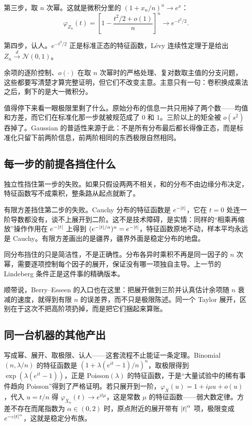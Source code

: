 第三步，取 \(n\) 次幂。这就是微积分里的 \((1+x_n/n)^n\to e^x\)：
\[
\varphi_{Z_n}(t)=\left[1-\frac{t^2/2+o(1)}{n}\right]^n\longrightarrow e^{-t^2/2}.
\]

第四步，认人。\(e^{-t^2/2}\) 正是标准正态的特征函数，Lévy 连续性定理于是给出 \(Z_n\xrightarrow{d}\mathcal N(0,1)\)。

余项的逐阶控制、\(o(\cdot)\) 在取 \(n\) 次幂时的严格处理、复对数取主值的分支问题，这些都要写清楚才算完整证明，但它们不改变主意。主意只有一句：卷积换成乘法之后，剩下的是大一微积分。

值得停下来看一眼极限里剩了什么。原始分布的信息一共只用掉了两个数——均值和方差，而它们在标准化那一步就被规范成了 \(0\) 和 \(1\)。三阶以上的矩全被 \(o(s^2)\) 吞掉了。Gaussian 的普适性来源于此：不是所有分布最后都长得像正态，而是标准化只留下前两阶信息，前两阶相同的东西极限自然相同。

\subsection{每一步的前提各挡住什么}

独立性挡住第一步的失败。如果只假设两两不相关，和的分布不由边缘分布决定，特征函数写不成乘积，整条路从起点就断了。

有限方差挡住第二步的失败。Cauchy 分布的特征函数是 \(e^{-\left|t\right|}\)，它在 \(t=0\) 处连一阶导数都没有，谈不上展开到二阶。这不是技术障碍，是实情：同样的``相乘再缩放''操作作用在 \(e^{-\left|t\right|}\) 上得到 \((e^{-\left|t\right|/n})^n=e^{-\left|t\right|}\)，特征函数原地不动，样本平均永远是 Cauchy。有限方差画出的是疆界，疆界外面是稳定分布的地盘。

同分布挡住的只是简洁性，不是正确性。分布各异时乘积不再是同一因子的 \(n\) 次幂，需要逐项控制每个因子的展开，保证没有哪一项独自主导。上一节的 Lindeberg 条件正是这件事的精确版本。

顺带说，Berry--Esseen 的入口也在这里：把展开做到三阶并认真估计余项随 \(n\) 衰减的速度，就得到有限 \(n\) 的误差界，而不只是极限陈述。同一个 Taylor 展开，区别在于这次不把高阶项扔掉，而是把它们捆起来算账。

\subsection{同一台机器的其他产出}

写成幂、展开、取极限、认人——这套流程不止能证一条定理。Binomial\((n,\lambda/n)\) 的特征函数是 \((1+\lambda(e^{it}-1)/n)^n\)，取极限得到 \(\exp(\lambda(e^{it}-1))\)，正是 Poisson\((\lambda)\) 的特征函数，于是``大量试验中的稀有事件趋向 Poisson''得到了严格证明。若只展开到一阶，\(\varphi_X(u)=1+i\mu u+o(u)\)，代入 \(u=t/n\) 得 \(\varphi_{\bar X_n}(t)\to e^{it\mu}\)，这是常数 \(\mu\) 的特征函数——弱大数定律。方差不存在而尾指数为 \(\alpha\in(0,2)\) 时，原点附近的展开带有 \(\left|t\right|^\alpha\) 项，极限变成 \(e^{-c\left|t\right|^\alpha}\)，这就是稳定分布族。

